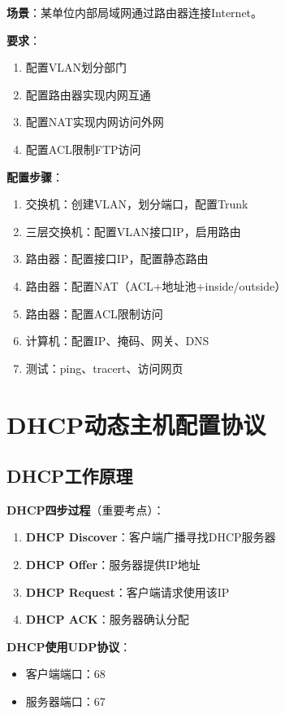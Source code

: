 \documentclass[12pt,a4paper]{ctexart}
\begin{document}
\begin{exambox}[综合实验]
\textbf{场景}：某单位内部局域网通过路由器连接Internet。

\textbf{要求}：
\begin{enumerate}[itemsep=0pt]
    \item 配置VLAN划分部门
    \item 配置路由器实现内网互通
    \item 配置NAT实现内网访问外网
    \item 配置ACL限制FTP访问
\end{enumerate}

\textbf{配置步骤}：
\begin{enumerate}[itemsep=0pt]
    \item 交换机：创建VLAN，划分端口，配置Trunk
    \item 三层交换机：配置VLAN接口IP，启用路由
    \item 路由器：配置接口IP，配置静态路由
    \item 路由器：配置NAT（ACL+地址池+inside/outside）
    \item 路由器：配置ACL限制访问
    \item 计算机：配置IP、掩码、网关、DNS
    \item 测试：ping、tracert、访问网页
\end{enumerate}
\end{exambox}


\section{DHCP动态主机配置协议}

\subsection{DHCP工作原理}

\begin{keybox}
\textbf{DHCP四步过程}（重要考点）：

\begin{enumerate}[itemsep=0pt]
    \item \textbf{DHCP Discover}：客户端广播寻找DHCP服务器
    \item \textbf{DHCP Offer}：服务器提供IP地址
    \item \textbf{DHCP Request}：客户端请求使用该IP
    \item \textbf{DHCP ACK}：服务器确认分配
\end{enumerate}

\textbf{DHCP使用UDP协议}：
\begin{itemize}[itemsep=0pt]
    \item 客户端端口：68
    \item 服务器端口：67
\end{itemize}
\end{keybox}
\end{document}
